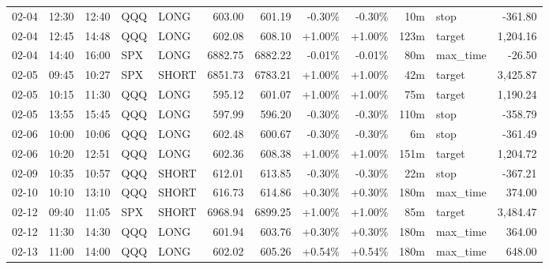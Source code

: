 \documentclass[11pt,a4paper,twoside]{article}
\begin{document}
\begin{center}
\begin{longtable}{>{\color{txtmain}}l l l l l r r r r r >{\color{txtmain}}l r}
02-04 & 12:30 & 12:40 & QQQ & LONG & 603.00 & 601.19 & \textcolor{lossred}{-0.30\%} & \textcolor{lossred}{-0.30\%} & 10m & stop & \textcolor{lossred}{-361.80} \\
02-04 & 12:45 & 14:48 & QQQ & LONG & 602.08 & 608.10 & \textcolor{wingreen}{+1.00\%} & \textcolor{wingreen}{+1.00\%} & 123m & target & \textcolor{wingreen}{1,204.16} \\
02-04 & 14:40 & 16:00 & SPX & LONG & 6882.75 & 6882.22 & \textcolor{lossred}{-0.01\%} & \textcolor{lossred}{-0.01\%} & 80m & max\_time & \textcolor{lossred}{-26.50} \\
02-05 & 09:45 & 10:27 & SPX & SHORT & 6851.73 & 6783.21 & \textcolor{wingreen}{+1.00\%} & \textcolor{wingreen}{+1.00\%} & 42m & target & \textcolor{wingreen}{3,425.87} \\
02-05 & 10:15 & 11:30 & QQQ & LONG & 595.12 & 601.07 & \textcolor{wingreen}{+1.00\%} & \textcolor{wingreen}{+1.00\%} & 75m & target & \textcolor{wingreen}{1,190.24} \\
02-05 & 13:55 & 15:45 & QQQ & LONG & 597.99 & 596.20 & \textcolor{lossred}{-0.30\%} & \textcolor{lossred}{-0.30\%} & 110m & stop & \textcolor{lossred}{-358.79} \\
02-06 & 10:00 & 10:06 & QQQ & LONG & 602.48 & 600.67 & \textcolor{lossred}{-0.30\%} & \textcolor{lossred}{-0.30\%} & 6m & stop & \textcolor{lossred}{-361.49} \\
02-06 & 10:20 & 12:51 & QQQ & LONG & 602.36 & 608.38 & \textcolor{wingreen}{+1.00\%} & \textcolor{wingreen}{+1.00\%} & 151m & target & \textcolor{wingreen}{1,204.72} \\
02-09 & 10:35 & 10:57 & QQQ & SHORT & 612.01 & 613.85 & \textcolor{lossred}{-0.30\%} & \textcolor{lossred}{-0.30\%} & 22m & stop & \textcolor{lossred}{-367.21} \\
02-10 & 10:10 & 13:10 & QQQ & SHORT & 616.73 & 614.86 & \textcolor{wingreen}{+0.30\%} & \textcolor{wingreen}{+0.30\%} & 180m & max\_time & \textcolor{wingreen}{374.00} \\
02-12 & 09:40 & 11:05 & SPX & SHORT & 6968.94 & 6899.25 & \textcolor{wingreen}{+1.00\%} & \textcolor{wingreen}{+1.00\%} & 85m & target & \textcolor{wingreen}{3,484.47} \\
02-12 & 11:30 & 14:30 & QQQ & LONG & 601.94 & 603.76 & \textcolor{wingreen}{+0.30\%} & \textcolor{wingreen}{+0.30\%} & 180m & max\_time & \textcolor{wingreen}{364.00} \\
02-13 & 11:00 & 14:00 & QQQ & LONG & 602.02 & 605.26 & \textcolor{wingreen}{+0.54\%} & \textcolor{wingreen}{+0.54\%} & 180m & max\_time & \textcolor{wingreen}{648.00} \\

\end{longtable}
\end{center}
\end{document}
